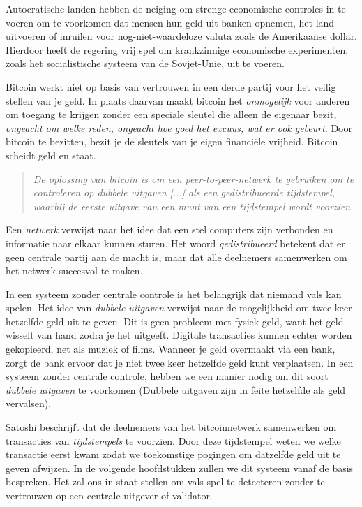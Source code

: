 \documentclass[
  letterpaper,
]{scrbook}
\begin{document}
Autocratische landen hebben de neiging om strenge economische controles
in te voeren om te voorkomen dat mensen hun geld uit banken opnemen, het
land uitvoeren of inruilen voor nog-niet-waardeloze valuta zoals de
Amerikaanse dollar. Hierdoor heeft de regering vrij spel om krankzinnige
economische experimenten, zoals het socialistische systeem van de
Sovjet-Unie, uit te voeren.

Bitcoin werkt niet op basis van vertrouwen in een derde partij voor het
veilig stellen van je geld. In plaats daarvan maakt bitcoin het
\emph{onmogelijk} voor anderen om toegang te krijgen zonder een speciale
sleutel die alleen de eigenaar bezit, \emph{ongeacht om welke reden,
ongeacht hoe goed het excuus, wat er ook gebeurt}. Door bitcoin te
bezitten, bezit je de sleutels van je eigen financiële vrijheid. Bitcoin
scheidt geld en staat.

\begin{quote}
\emph{De oplossing van bitcoin is om een peer-to-peer-netwerk te
gebruiken om te controleren op dubbele uitgaven {[}...{]} als een
gedistribueerde tijdstempel, waarbij de eerste uitgave van een munt van
een tijdstempel wordt voorzien.}
\end{quote}

Een \emph{netwerk} verwijst naar het idee dat een stel computers zijn
verbonden en informatie naar elkaar kunnen sturen. Het woord
\emph{gedistribueerd} betekent dat er geen centrale partij aan de macht
is, maar dat alle deelnemers samenwerken om het netwerk succesvol te
maken.

In een systeem zonder centrale controle is het belangrijk dat niemand
vals kan spelen. Het idee van \emph{dubbele uitgaven} verwijst naar de
mogelijkheid om twee keer hetzelfde geld uit te geven. Dit is geen
probleem met fysiek geld, want het geld wisselt van hand zodra je het
uitgeeft. Digitale transacties kunnen echter worden gekopieerd, net als
muziek of films. Wanneer je geld overmaakt via een bank, zorgt de bank
ervoor dat je niet twee keer hetzelfde geld kunt verplaatsen. In een
systeem zonder centrale controle, hebben we een manier nodig om dit
soort \emph{dubbele uitgaven} te voorkomen (Dubbele uitgaven zijn in
feite hetzelfde als geld vervalsen).

Satoshi beschrijft dat de deelnemers van het bitcoinnetwerk samenwerken
om transacties van \emph{tijdstempels} te voorzien. Door deze
tijdstempel weten we welke transactie eerst kwam zodat we toekomstige
pogingen om datzelfde geld uit te geven afwijzen. In de volgende
hoofdstukken zullen we dit systeem vanaf de basis bespreken. Het zal ons
in staat stellen om vals spel te detecteren zonder te vertrouwen op een
centrale uitgever of validator.
\end{document}
